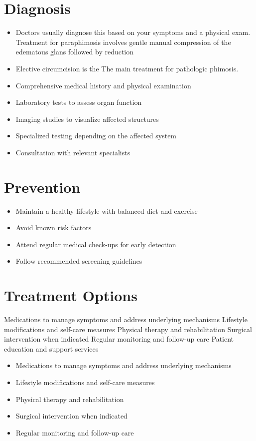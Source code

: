 \section{Diagnosis}
\begin{itemize}[noitemsep]
  \item Doctors usually diagnose this based on your symptoms and a physical exam. Treatment for paraphimosis involves gentle manual compression of the edematous glans followed by reduction
  \item Elective circumcision is the The main treatment for pathologic phimosis.
  \item Comprehensive medical history and physical examination
  \item Laboratory tests to assess organ function
  \item Imaging studies to visualize affected structures
  \item Specialized testing depending on the affected system
  \item Consultation with relevant specialists
\end{itemize}
\section{Prevention}
\begin{itemize}[noitemsep]
  \item Maintain a healthy lifestyle with balanced diet and exercise
  \item Avoid known risk factors
  \item Attend regular medical check-ups for early detection
  \item Follow recommended screening guidelines
\end{itemize}
\section{Treatment Options}
Medications to manage symptoms and address underlying mechanisms Lifestyle modifications and self-care measures Physical therapy and rehabilitation Surgical intervention when indicated Regular monitoring and follow-up care Patient education and support services

\begin{itemize}[noitemsep]
  \item Medications to manage symptoms and address underlying mechanisms
  \item Lifestyle modifications and self-care measures
  \item Physical therapy and rehabilitation
  \item Surgical intervention when indicated
  \item Regular monitoring and follow-up care
\end{itemize}
